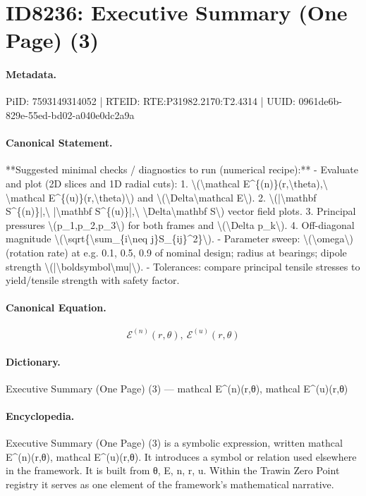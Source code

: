 \section*{ID8236: Executive Summary (One Page) (3)}
\paragraph{Metadata.}
PiID: 7593149314052 | RTEID: RTE:P31982.2170:T2.4314 | UUID: 0961de6b-829e-55ed-bd02-a040e0dc2a9a

\paragraph{Canonical Statement.}
**Suggested minimal checks / diagnostics to run (numerical recipe):** - Evaluate and plot (2D slices and 1D radial cuts): 1. \textbackslash{}(\textbackslash{}mathcal E\textasciicircum{}\{(n)\}(r,\textbackslash{}theta),\textbackslash{} \textbackslash{}mathcal E\textasciicircum{}\{(u)\}(r,\textbackslash{}theta)\textbackslash{}) and \textbackslash{}(\textbackslash{}Delta\textbackslash{}mathcal E\textbackslash{}). 2. \textbackslash{}(|\textbackslash{}mathbf S\textasciicircum{}\{(n)\}|,\textbackslash{} |\textbackslash{}mathbf S\textasciicircum{}\{(u)\}|,\textbackslash{} \textbackslash{}Delta\textbackslash{}mathbf S\textbackslash{}) vector field plots. 3. Principal pressures \textbackslash{}(p\_1,p\_2,p\_3\textbackslash{}) for both frames and \textbackslash{}(\textbackslash{}Delta p\_k\textbackslash{}). 4. Off-diagonal magnitude \textbackslash{}(\textbackslash{}sqrt\{\textbackslash{}sum\_\{i\textbackslash{}neq j\}S\_\{ij\}\textasciicircum{}2\}\textbackslash{}). - Parameter sweep: \textbackslash{}(\textbackslash{}omega\textbackslash{}) (rotation rate) at e.g. 0.1, 0.5, 0.9 of nominal design; radius at bearings; dipole strength \textbackslash{}(|\textbackslash{}boldsymbol\textbackslash{}mu|\textbackslash{}). - Tolerances: compare principal tensile stresses to yield/tensile strength with safety factor.

\paragraph{Canonical Equation.}
\[
\mathcal E^{(n)}(r,\theta),\ \mathcal E^{(u)}(r,\theta)
\]

\paragraph{Dictionary.}
Executive Summary (One Page) (3) — mathcal E\textasciicircum{}(n)(r,θ), mathcal E\textasciicircum{}(u)(r,θ)

\paragraph{Encyclopedia.}
Executive Summary (One Page) (3) is a symbolic expression, written mathcal E\textasciicircum{}(n)(r,θ), mathcal E\textasciicircum{}(u)(r,θ). It introduces a symbol or relation used elsewhere in the framework. It is built from θ, E, n, r, u. Within the Trawin Zero Point registry it serves as one element of the framework's mathematical narrative.
